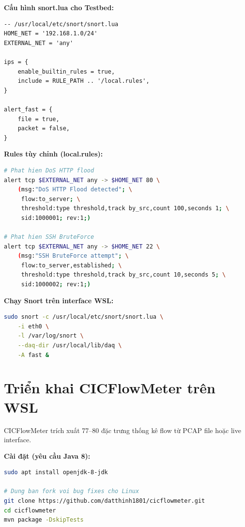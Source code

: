 \documentclass[../DoAn.tex]{subfiles}
\begin{document}
\textbf{Cấu hình snort.lua cho Testbed:}

\begin{lstlisting}[language={[5.1]Lua}, caption={Cấu hình tối thiểu snort.lua cho môi trường Testbed}]
-- /usr/local/etc/snort/snort.lua
HOME_NET = '192.168.1.0/24'
EXTERNAL_NET = 'any'

ips = {
    enable_builtin_rules = true,
    include = RULE_PATH .. '/local.rules',
}

alert_fast = {
    file = true,
    packet = false,
}
\end{lstlisting}

\textbf{Rules tùy chỉnh (local.rules):}

\begin{lstlisting}[language=bash, caption={Rules Snort phát hiện DoS và BruteForce SSH}]
# Phat hien DoS HTTP flood
alert tcp $EXTERNAL_NET any -> $HOME_NET 80 \
    (msg:"DoS HTTP Flood detected"; \
     flow:to_server; \
     threshold:type threshold,track by_src,count 100,seconds 1; \
     sid:1000001; rev:1;)

# Phat hien SSH BruteForce
alert tcp $EXTERNAL_NET any -> $HOME_NET 22 \
    (msg:"SSH BruteForce attempt"; \
     flow:to_server,established; \
     threshold:type threshold,track by_src,count 10,seconds 5; \
     sid:1000002; rev:1;)
\end{lstlisting}

\textbf{Chạy Snort trên interface WSL:}

\begin{lstlisting}[language=bash, caption={Khởi động Snort 3 trên interface eth0}]
sudo snort -c /usr/local/etc/snort/snort.lua \
    -i eth0 \
    -l /var/log/snort \
    --daq-dir /usr/local/lib/daq \
    -A fast &
\end{lstlisting}

\section{Triển khai CICFlowMeter trên WSL}
\label{sec:pla-cicflowmeter}

CICFlowMeter trích xuất 77--80 đặc trưng thống kê flow từ PCAP file hoặc live interface.

\textbf{Cài đặt (yêu cầu Java 8):}

\begin{lstlisting}[language=bash, caption={Cài đặt CICFlowMeter trên Ubuntu}]
sudo apt install openjdk-8-jdk

# Dung ban fork voi bug fixes cho Linux
git clone https://github.com/datthinh1801/cicflowmeter.git
cd cicflowmeter
mvn package -DskipTests
\end{lstlisting}
\end{document}

